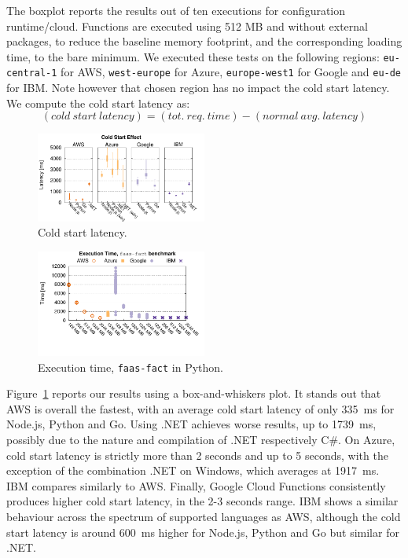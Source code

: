 The boxplot reports the results out of ten executions for configuration runtime/cloud. 
Functions are executed using 512 \gls{MB} and without external packages, to reduce the baseline memory footprint, and the corresponding loading time, to the bare minimum.
We executed these tests on the following regions: \texttt{eu-central-1} for AWS,  \texttt{west-europe} for Azure,  \texttt{europe-west1} for Google and \texttt{eu-de} for IBM. 
Note however that chosen region has no impact the cold start latency. 
We compute the cold start latency as:
\begin{equation*}
(cold\ start\ latency) = (tot.\ req.\ time) - (normal\ avg.\ latency)
\end{equation*}

\begin{figure}[!t]
\centering
\includegraphics[width=0.5\textwidth]{bilder/cold_start/coldstart_whisker.pdf}
\caption{Cold start latency.}
\label{fig:coldstart_plot}
\end{figure}



\begin{figure}[!t]
\centering
\includegraphics[width=0.5\textwidth, trim={0 40 0 0}]{bilder/general_python/cpufact.pdf}
\caption{Execution time, \texttt{faas-fact} in Python.}
\label{fig:general_python_plot}
\end{figure}

Figure~\ref{fig:coldstart_plot} reports our results using a box-and-whiskers plot.
It stands out that \gls{AWS} is overall the fastest, with an average cold start latency of only 335~ms for Node.js, Python and Go. 
Using .NET achieves worse results, up to 1739~ms, possibly due to the nature and compilation of .NET respectively C\#. 
On Azure, cold start latency is strictly more than 2 seconds and up to 5 seconds, with the exception of the combination .NET on Windows, which averages at 1917~ms. 
IBM compares similarly to \gls{AWS}.
Finally, Google Cloud Functions consistently produces higher cold start latency, in the 2-3 seconds range. 
\gls{IBM} shows a similar behaviour across the spectrum of supported languages as \gls{AWS},  although the cold start latency is around 600~ms higher for Node.js, Python and Go but similar for .NET.

